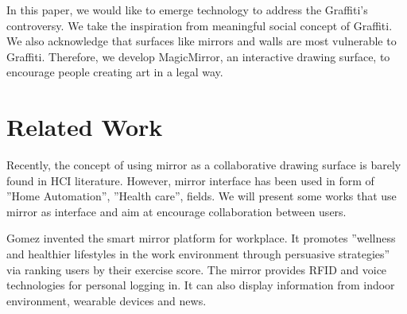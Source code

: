 \documentclass{sigchi-ext}
\begin{document}
In this paper, we would like to emerge technology to address the Graffiti's controversy. We take the inspiration from meaningful social concept of Graffiti. We also acknowledge that surfaces like mirrors and walls are most vulnerable to Graffiti.  Therefore, we develop MagicMirror, an interactive drawing surface, to encourage people creating art in a legal way.

\section{Related Work}
Recently, the concept of using mirror as a collaborative drawing surface is barely found in HCI literature. However, mirror interface has been used in form of ''Home Automation'', ''Health care'', fields. We will present some works that use mirror as interface and aim at encourage collaboration between users.

Gomez \cite{gomez-carmonaSmiWorkInteractiveSmart2017} invented the smart mirror platform for workplace. It promotes ''wellness and healthier lifestyles in the work environment through persuasive strategies'' via ranking users by their exercise score. The mirror provides RFID and voice technologies for personal logging in. It can also display information from indoor environment, wearable devices and news.
\end{document}
